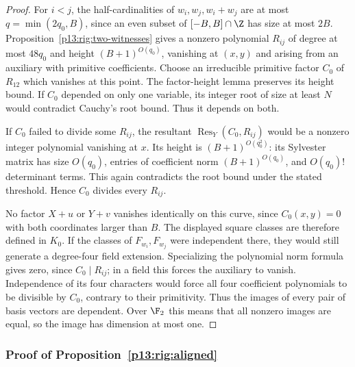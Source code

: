 \begin{proof}
For $i<j$, the half-cardinalities of $w_i,w_j,w_i+w_j$
are at most $q=\min(2q_0,B)$, since an even subset of
$[-B,B]\cap\Z$ has size at most $2B$.
Proposition~\ref{p13:rig:two-witnesses} gives a nonzero
polynomial $R_{ij}$ of degree at most $48q_0$ and height
$(B+1)^{O(q_0)}$, vanishing at $(x,y)$ and arising from
an auxiliary with primitive coefficients.
Choose an irreducible primitive factor $C_0$ of $R_{12}$
which vanishes at this point.  The factor-height lemma
preserves its height bound.  If $C_0$ depended on only one
variable, its integer root of size at least $N$ would
contradict Cauchy's root bound.  Thus it depends on both.

If $C_0$ failed to divide some $R_{ij}$, the resultant
$\operatorname{Res}_Y(C_0,R_{ij})$ would be a nonzero integer
polynomial vanishing at $x$.  Its height is
$(B+1)^{O(q_0^2)}$: its Sylvester matrix has size $O(q_0)$,
entries of coefficient norm $(B+1)^{O(q_0)}$, and
$O(q_0)!$ determinant terms.  This again contradicts the
root bound under the stated threshold.  Hence $C_0$ divides
every $R_{ij}$.

No factor $X+u$ or $Y+v$ vanishes identically on this curve,
since $C_0(x,y)=0$ with both coordinates larger than $B$.
The displayed square classes are therefore defined in
$K_0$.  If the classes of $F_{w_i},F_{w_j}$ were independent
there, they would still generate a degree-four field
extension.  Specializing the polynomial norm formula gives
zero, since $C_0\mid R_{ij}$; in a field this forces the
auxiliary to vanish.  Independence of its four characters
would force all four coefficient polynomials to be divisible
by $C_0$, contrary to their primitivity.  Thus the images
of every pair of basis vectors are dependent.  Over $\F_2$
this means that all nonzero images are equal, so the image
has dimension at most one.
\end{proof}

\subsubsection{Proof of Proposition~\ref{p13:rig:aligned}}
\label{p14:comp:rigidity:aligned}

